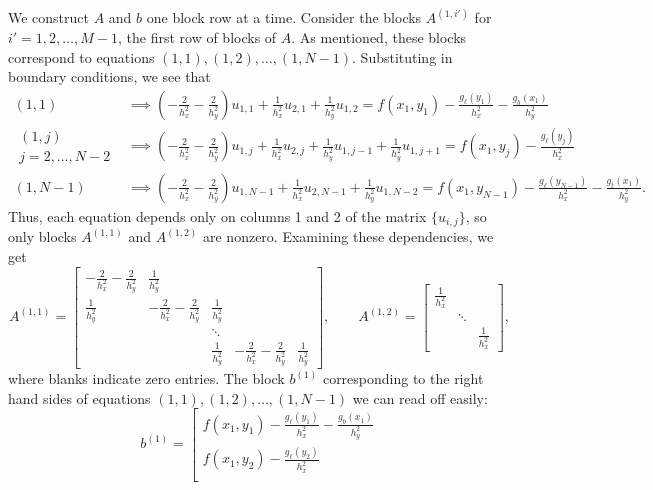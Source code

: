 \documentclass{homework}
\begin{document}
\begin{alphaparts}
		We construct $A$ and $b$ one block row at a time. Consider the blocks $A^{(1,i')}$ for $i'=1,2,\dots, M-1$, the first row of blocks of $A$. As mentioned, these blocks correspond to equations $(1,1),(1,2), \dots, (1,N-1)$. Substituting in boundary conditions, we see that
		\begin{align*}
			(1,1) &\implies \left(-\frac{2}{h_x^2}-\frac{2}{h_y^2}\right)u_{1,1} + \frac{1}{h_x^2}u_{2,1} + \frac{1}{h_y^2}u_{1,2} = f(x_1,y_1) - \frac{g_\ell(y_1)}{h_x^2} - \frac{g_b(x_1)}{h_y^2} \\
			\substack{(1,j) \\ j=2,\dots,N-2} &\implies \left(-\frac{2}{h_x^2}-\frac{2}{h_y^2}\right)u_{1,j} + \frac{1}{h_x^2}u_{2,j} + \frac{1}{h_y^2}u_{1,j-1} + \frac{1}{h_y^2}u_{1,j+1} = f(x_1,y_j) - \frac{g_\ell(y_j)}{h_x^2}\\
			(1,N-1) &\implies \left(-\frac{2}{h_x^2}-\frac{2}{h_y^2}\right)u_{1,N-1} + \frac{1}{h_x^2}u_{2,N-1} + \frac{1}{h_y^2}u_{1,N-2} = f(x_1, y_{N-1}) - \frac{g_\ell(y_{N-1})}{h_x^2} - \frac{g_t(x_1)}{h_y^2}.
		\end{align*}
		Thus, each equation depends only on columns 1 and 2 of the matrix $\{u_{i,j}\}$, so only blocks $A^{(1,1)}$ and $A^{(1,2)}$ are nonzero. Examining these dependencies, we get
		\begin{equation*}
			A^{(1,1)} = \left[\begin{matrix}
				-\frac{2}{h_x^2}-\frac{2}{h_y^2} & \frac{1}{h_y^2} \\
				\frac{1}{h_y^2} & -\frac{2}{h_x^2}-\frac{2}{h_y^2} & \frac{1}{h_y^2} \\
				& & \ddots \\
				& & \frac{1}{h_y^2} & -\frac{2}{h_x^2}-\frac{2}{h_y^2}  & \frac{1}{h_y^2}
			\end{matrix}\right], \qquad
			A^{(1,2)} = \left[\begin{matrix}\frac{1}{h_x^2} \\ & \ddots \\ & & \frac{1}{h_x^2} \end{matrix}\right],
		\end{equation*}
		where blanks indicate zero entries. The block $b^{(1)}$ corresponding to the right hand sides of equations $(1,1),(1,2), \dots, (1,N-1)$ we can read off easily:
		\begin{equation*}
			b^{(1)} = \left[\begin{matrix}
				f(x_1,y_1) - \frac{g_\ell(y_1)}{h_x^2} - \frac{g_b(x_1)}{h_y^2} \\
				f(x_1,y_2) - \frac{g_\ell(y_2)}{h_x^2} \\

\end{matrix}
\end{equation*}
\end{alphaparts}
\end{document}
